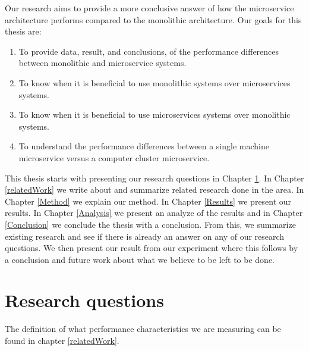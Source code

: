 \documentclass[a4paper,oneside]{bth}
\begin{document}
\par\vspace {0.5cm}
Our research aims to provide a more conclusive answer of how the microservice architecture performs compared to the monolithic architecture. 
Our goals for this thesis are:

\begin{enumerate}

\item To provide data, result, and conclusions, of the performance differences between monolithic and microservice systems.
\item To know when it is beneficial to use monolithic systems over microservices systems.
\item To know when it is beneficial to use microservices systems over monolithic systems. 
\item To understand the performance differences between a single machine microservice versus a computer cluster microservice.
    
\end{enumerate}

\par\vspace {0.5cm}
This thesis starts with presenting our research questions in Chapter \ref{RQ}. In Chapter \ref{relatedWork} we write about and summarize related research done in the area. In Chapter \ref{Method} we explain our method. In Chapter \ref{Results} we present our results. In Chapter \ref{Analysis} we present an analyze of the results and in Chapter \ref{Conclusion} we conclude the thesis with a conclusion. From this, we summarize existing research and see if there is already an answer on any of our research questions. We then present our result from our experiment where this follows by a conclusion and future work about what we believe to be left to be done.


\chapter{Research questions} \label{RQ}

The definition of what performance characteristics we are measuring can be found in chapter \ref{relatedWork}.\\
\end{document}
